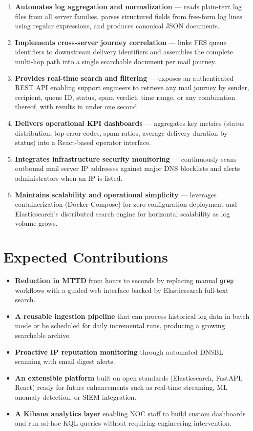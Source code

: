 \documentclass[12pt,a4paper,oneside]{report}
\begin{document}
\begin{enumerate}
  \item \textbf{Automates log aggregation and normalization} --- reads plain-text log files from all server families, parses structured fields from free-form log lines using regular expressions, and produces canonical JSON documents.
  \item \textbf{Implements cross-server journey correlation} --- links FES queue identifiers to downstream delivery identifiers and assembles the complete multi-hop path into a single searchable document per mail journey.
  \item \textbf{Provides real-time search and filtering} --- exposes an authenticated REST API enabling support engineers to retrieve any mail journey by sender, recipient, queue ID, status, spam verdict, time range, or any combination thereof, with results in under one second.
  \item \textbf{Delivers operational KPI dashboards} --- aggregates key metrics (status distribution, top error codes, spam ratios, average delivery duration by status) into a React-based operator interface.
  \item \textbf{Integrates infrastructure security monitoring} --- continuously scans outbound mail server IP addresses against major DNS blocklists and alerts administrators when an IP is listed.
  \item \textbf{Maintains scalability and operational simplicity} --- leverages containerization (Docker Compose) for zero-configuration deployment and Elasticsearch's distributed search engine for horizontal scalability as log volume grows.
\end{enumerate}

\section*{Expected Contributions}
{}

\begin{itemize}
  \item \textbf{Reduction in MTTD} from hours to seconds by replacing manual \texttt{grep} workflows with a guided web interface backed by Elasticsearch full-text search.
  \item \textbf{A reusable ingestion pipeline} that can process historical log data in batch mode or be scheduled for daily incremental runs, producing a growing searchable archive.
  \item \textbf{Proactive IP reputation monitoring} through automated DNSBL scanning with email digest alerts.
  \item \textbf{An extensible platform} built on open standards (Elasticsearch, FastAPI, React) ready for future enhancements such as real-time streaming, ML anomaly detection, or SIEM integration.
  \item \textbf{A Kibana analytics layer} enabling NOC staff to build custom dashboards and run ad-hoc KQL queries without requiring engineering intervention.
\end{itemize}
\end{document}

